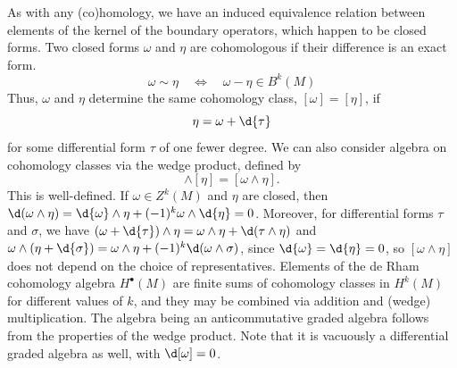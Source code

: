 \documentclass[a4paper,12pt]{article}
\begin{document}
As with any (co)homology, we have an induced equivalence relation between elements of the kernel of the boundary operators, which happen to be closed forms.
Two closed forms $\omega$ and $\eta$ are cohomologous if their difference is an exact form.
\begin{equation}
    \omega \sim \eta \quad \iff \quad \omega - \eta \in B^k(M)
\end{equation}
Thus, $\omega$ and $\eta$ determine the same cohomology class, $[\omega] = [\eta]$, if
\begin{equation}
    \eta = \omega + \d{\tau}
\end{equation}
for some differential form $\tau$ of one fewer degree.
We can also consider algebra on cohomology classes via the wedge product, defined by
\begin{equation}
    [\omega] \wedge [\eta] = [\omega \wedge \eta].
\end{equation}
This is well-defined.
If $\omega \in Z^k(M)$ and $\eta$ are closed, then $\d(\omega \wedge \eta) = \d{\omega} \wedge \eta + (-1)^k \omega \wedge \d{\eta} = 0$.
Moreover, for differential forms $\tau$ and $\sigma$, we have $(\omega + \d{\tau}) \wedge \eta = \omega \wedge \eta + \d(\tau \wedge \eta)$ and $\omega \wedge (\eta + \d{\sigma}) = \omega \wedge \eta + (-1)^k \d(\omega \wedge \sigma)$, since $\d{\omega} = \d{\eta} = 0$, so $[\omega \wedge \eta]$ does not depend on the choice of representatives.
Elements of the de Rham cohomology algebra $H^\bullet(M)$ are finite sums of cohomology classes in $H^k(M)$ for different values of $k$, and they may be combined via addition and (wedge) multiplication.
The algebra being an anticommutative graded algebra follows from the properties of the wedge product.
Note that it is vacuously a differential graded algebra as well, with $\d[\omega] = 0$.
\end{document}
